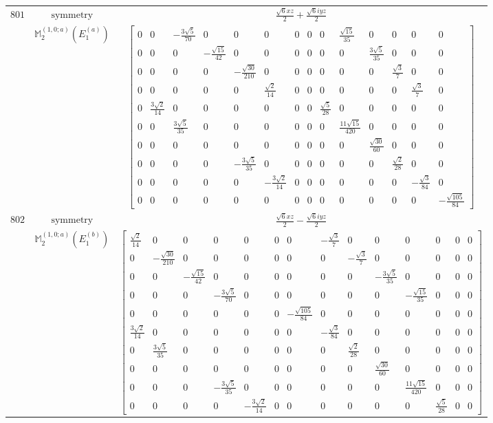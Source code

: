 \documentclass[fleqn,8pt,landscape]{jsarticle}
\begin{document}
\begin{longtable}{ccc}
$ 801 $ & $ \text{symmetry} $ & $ \frac{\sqrt{6} x z}{2} + \frac{\sqrt{6} i y z}{2} $ \\
$  $ & $ \mathbb{M}_{2}^{(1,0;a)}(E_{1}^{(a)}) $ & $ \begin{bmatrix} 0 & 0 & - \frac{3 \sqrt{5}}{70} & 0 & 0 & 0 & 0 & 0 & 0 & \frac{\sqrt{15}}{35} & 0 & 0 & 0 & 0 \\ 0 & 0 & 0 & - \frac{\sqrt{15}}{42} & 0 & 0 & 0 & 0 & 0 & 0 & \frac{3 \sqrt{5}}{35} & 0 & 0 & 0 \\ 0 & 0 & 0 & 0 & - \frac{\sqrt{30}}{210} & 0 & 0 & 0 & 0 & 0 & 0 & \frac{\sqrt{3}}{7} & 0 & 0 \\ 0 & 0 & 0 & 0 & 0 & \frac{\sqrt{2}}{14} & 0 & 0 & 0 & 0 & 0 & 0 & \frac{\sqrt{3}}{7} & 0 \\ 0 & \frac{3 \sqrt{2}}{14} & 0 & 0 & 0 & 0 & 0 & 0 & \frac{\sqrt{5}}{28} & 0 & 0 & 0 & 0 & 0 \\ 0 & 0 & \frac{3 \sqrt{5}}{35} & 0 & 0 & 0 & 0 & 0 & 0 & \frac{11 \sqrt{15}}{420} & 0 & 0 & 0 & 0 \\ 0 & 0 & 0 & 0 & 0 & 0 & 0 & 0 & 0 & 0 & \frac{\sqrt{30}}{60} & 0 & 0 & 0 \\ 0 & 0 & 0 & 0 & - \frac{3 \sqrt{5}}{35} & 0 & 0 & 0 & 0 & 0 & 0 & \frac{\sqrt{2}}{28} & 0 & 0 \\ 0 & 0 & 0 & 0 & 0 & - \frac{3 \sqrt{2}}{14} & 0 & 0 & 0 & 0 & 0 & 0 & - \frac{\sqrt{3}}{84} & 0 \\ 0 & 0 & 0 & 0 & 0 & 0 & 0 & 0 & 0 & 0 & 0 & 0 & 0 & - \frac{\sqrt{105}}{84} \end{bmatrix} $ \\ \hline
$ 802 $ & $ \text{symmetry} $ & $ \frac{\sqrt{6} x z}{2} - \frac{\sqrt{6} i y z}{2} $ \\
$  $ & $ \mathbb{M}_{2}^{(1,0;a)}(E_{1}^{(b)}) $ & $ \begin{bmatrix} \frac{\sqrt{2}}{14} & 0 & 0 & 0 & 0 & 0 & 0 & - \frac{\sqrt{3}}{7} & 0 & 0 & 0 & 0 & 0 & 0 \\ 0 & - \frac{\sqrt{30}}{210} & 0 & 0 & 0 & 0 & 0 & 0 & - \frac{\sqrt{3}}{7} & 0 & 0 & 0 & 0 & 0 \\ 0 & 0 & - \frac{\sqrt{15}}{42} & 0 & 0 & 0 & 0 & 0 & 0 & - \frac{3 \sqrt{5}}{35} & 0 & 0 & 0 & 0 \\ 0 & 0 & 0 & - \frac{3 \sqrt{5}}{70} & 0 & 0 & 0 & 0 & 0 & 0 & - \frac{\sqrt{15}}{35} & 0 & 0 & 0 \\ 0 & 0 & 0 & 0 & 0 & 0 & - \frac{\sqrt{105}}{84} & 0 & 0 & 0 & 0 & 0 & 0 & 0 \\ \frac{3 \sqrt{2}}{14} & 0 & 0 & 0 & 0 & 0 & 0 & - \frac{\sqrt{3}}{84} & 0 & 0 & 0 & 0 & 0 & 0 \\ 0 & \frac{3 \sqrt{5}}{35} & 0 & 0 & 0 & 0 & 0 & 0 & \frac{\sqrt{2}}{28} & 0 & 0 & 0 & 0 & 0 \\ 0 & 0 & 0 & 0 & 0 & 0 & 0 & 0 & 0 & \frac{\sqrt{30}}{60} & 0 & 0 & 0 & 0 \\ 0 & 0 & 0 & - \frac{3 \sqrt{5}}{35} & 0 & 0 & 0 & 0 & 0 & 0 & \frac{11 \sqrt{15}}{420} & 0 & 0 & 0 \\ 0 & 0 & 0 & 0 & - \frac{3 \sqrt{2}}{14} & 0 & 0 & 0 & 0 & 0 & 0 & \frac{\sqrt{5}}{28} & 0 & 0 \end{bmatrix} $ \\ \hline

\end{longtable}
\end{document}
